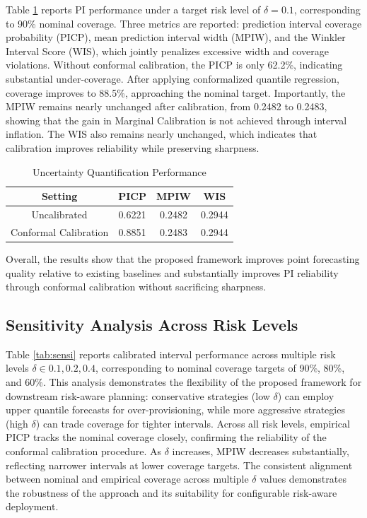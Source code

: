 \documentclass[conference]{IEEEtran}
\begin{document}
Table \ref{tab:uq-performance} reports PI performance under a target risk level of $\delta = 0.1$, corresponding to 90\% nominal coverage. Three metrics are reported: prediction interval coverage probability (PICP), mean prediction interval width (MPIW), and the Winkler Interval Score (WIS), which jointly penalizes excessive width and coverage violations. Without conformal calibration, the PICP is only 62.2\%, indicating substantial under-coverage. After applying conformalized quantile regression, coverage improves to 88.5\%, approaching the nominal target. Importantly, the MPIW remains nearly unchanged after calibration, from 0.2482 to 0.2483, showing that the gain in Marginal Calibration is not achieved through interval inflation. The WIS also remains nearly unchanged, which indicates that calibration improves reliability while preserving sharpness.


\begin{table}[htbp]
\caption{Uncertainty Quantification Performance}
\begin{center}
\begin{tabular}{|c|c|c|c|}
\hline
\textbf{Setting} & \textbf{PICP} & \textbf{MPIW} & \textbf{WIS} \\
\hline
Uncalibrated & 0.6221 & 0.2482 & 0.2944\\
\hline
Conformal Calibration & 0.8851 & 0.2483 & 0.2944\\
\hline
\end{tabular}
\label{tab:uq-performance}
\end{center}
\end{table}
\vspace{-4mm}

Overall, the results show that the proposed framework improves point forecasting quality relative to existing baselines and substantially improves PI reliability through conformal calibration without sacrificing sharpness.

\subsection{Sensitivity Analysis Across Risk Levels}

Table \ref{tab:sensi} reports calibrated interval performance across multiple risk levels $\delta \in {0.1, 0.2, 0.4}$, corresponding to nominal coverage targets of 90\%, 80\%, and 60\%. This analysis demonstrates the flexibility of the proposed framework for downstream risk-aware planning: conservative strategies (low $\delta$) can employ upper quantile forecasts for over-provisioning, while more aggressive strategies (high $\delta$) can trade coverage for tighter intervals. Across all risk levels, empirical PICP tracks the nominal coverage closely, confirming the reliability of the conformal calibration procedure. As $\delta$ increases, MPIW decreases substantially, reflecting narrower intervals at lower coverage targets. The consistent alignment between nominal and empirical coverage across multiple $\delta$ values demonstrates the robustness of the approach and its suitability for configurable risk-aware deployment.
\end{document}
